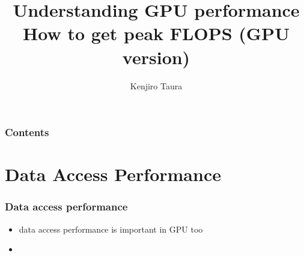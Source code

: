 \documentclass[12pt,dvipdfmx]{beamer}
\title{Understanding GPU performance \\
  {\scriptsize How to get peak FLOPS (GPU version)}}
\institute{}
\author{Kenjiro Taura}
\date{}
\begin{document}
\maketitle

\begin{frame}
\frametitle{Contents}
\tableofcontents
\end{frame}


\section{Data Access Performance}
\begin{frame}
  \frametitle{Data access performance}
  \begin{itemize}
  \item data access performance is important in GPU too
  \item 
  \end{itemize}
\end{frame}
\end{document}
